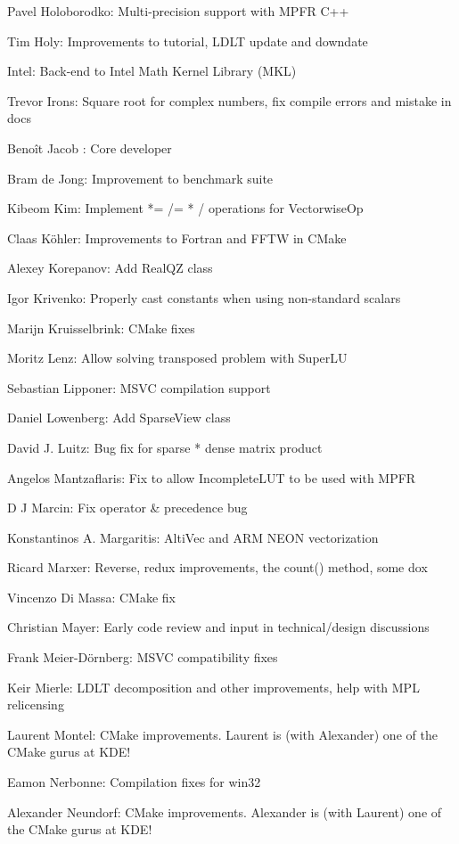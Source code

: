 Pavel Holoborodko:  Multi-precision support with MPFR C++  

Tim Holy:  Improvements to tutorial, LDLT update and downdate  

Intel:  Back-end to Intel Math Kernel Library (MKL)  

Trevor Irons:  Square root for complex numbers, fix compile errors and mistake in docs  

Benoît Jacob : Core developer  

Bram de Jong:  Improvement to benchmark suite  

Kibeom Kim:  Implement *= /= * / operations for VectorwiseOp  

Claas Köhler:  Improvements to Fortran and FFTW in CMake  

Alexey Korepanov:  Add RealQZ class  

Igor Krivenko:  Properly cast constants when using non-standard scalars  

Marijn Kruisselbrink:  CMake fixes  

Moritz Lenz:  Allow solving transposed problem with SuperLU  

Sebastian Lipponer:  MSVC compilation support  

Daniel Lowenberg:  Add SparseView class  

David J. Luitz:  Bug fix for sparse * dense matrix product  

Angelos Mantzaflaris:  Fix to allow IncompleteLUT to be used with MPFR  

D J Marcin:  Fix operator \& precedence bug  

Konstantinos A. Margaritis:  AltiVec and ARM NEON vectorization  

Ricard Marxer:  Reverse, redux improvements, the count() method, some dox  

Vincenzo Di Massa:  CMake fix  

Christian Mayer:  Early code review and input in technical/design discussions  

Frank Meier-Dörnberg:  MSVC compatibility fixes  

Keir Mierle:  LDLT decomposition and other improvements, help with MPL relicensing  

Laurent Montel:  CMake improvements. Laurent is (with Alexander) one of the CMake gurus at KDE!  

Eamon Nerbonne:  Compilation fixes for win32  

Alexander Neundorf:  CMake improvements. Alexander is (with Laurent) one of the CMake gurus at KDE!  

